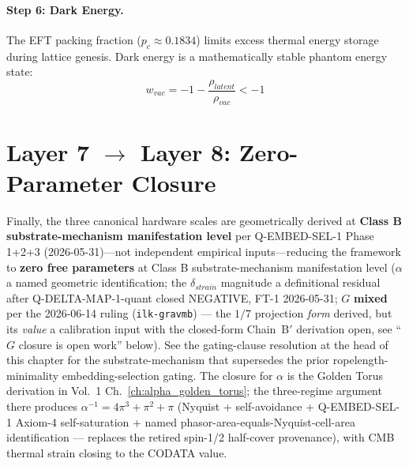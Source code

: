 \paragraph{Step 6: Dark Energy.}
The EFT packing fraction ($p_c \approx 0.1834$) limits excess thermal energy
storage during lattice genesis. Dark energy is a mathematically stable phantom
energy state:
\begin{equation}
    w_{vac} = -1 - \frac{\rho_{latent}}{\rho_{vac}} < -1
    \label{eq:dark_energy}
\end{equation}

\section{Layer 7 $\to$ Layer 8: Zero-Parameter Closure}
\label{sec:layer78}

Finally, the three canonical hardware scales are geometrically derived at
\textbf{Class B substrate-mechanism manifestation level} per Q-EMBED-SEL-1
Phase 1+2+3 (2026-05-31)---not independent empirical inputs---reducing the
framework to \textbf{zero free parameters} at Class B substrate-mechanism
manifestation level ($\alpha$ a named geometric identification; the
$\delta_{strain}$ magnitude a definitional residual after Q-DELTA-MAP-1-quant
closed NEGATIVE, FT-1 2026-05-31; $G$ \textbf{mixed} per the 2026-06-14 ruling
(\texttt{ilk-gravmb}) --- the $1/7$ projection \emph{form} derived, but its
\emph{value} a calibration input with the closed-form Chain~B$'$ derivation
open, see ``$G$ closure is open work'' below). See the
gating-clause resolution at the head of this chapter for the substrate-mechanism
that supersedes the prior ropelength-minimality embedding-selection gating.
The closure for $\alpha$ is the Golden Torus derivation in Vol.~1
Ch.~\ref{ch:alpha_golden_torus}; the three-regime argument there produces
$\alpha^{-1} = 4\pi^3 + \pi^2 + \pi$ (Nyquist + self-avoidance + Q-EMBED-SEL-1
Axiom-4 self-saturation + named phasor-area-equals-Nyquist-cell-area
identification --- replaces the retired spin-1/2 half-cover provenance), with
CMB thermal strain closing to the CODATA value.

